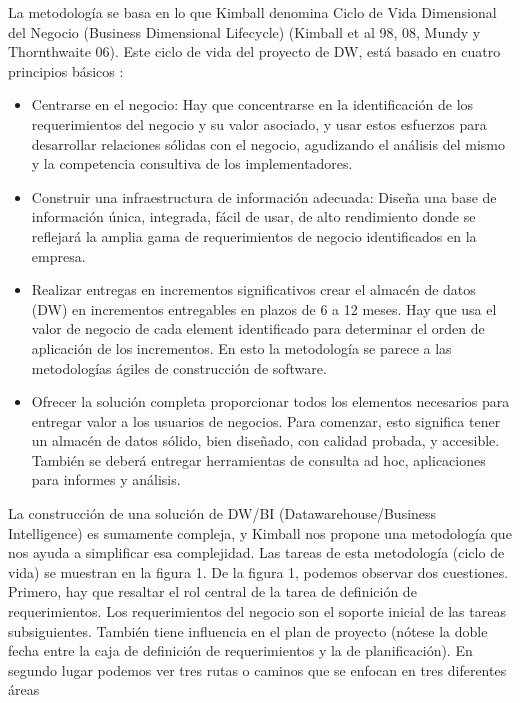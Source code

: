 \documentclass[preprint,12pt]{elsarticle}
\begin{document}
\begin{enumerate}[3.1]
La metodología se basa en lo que Kimball denomina Ciclo de Vida Dimensional del Negocio (Business Dimensional Lifecycle) (Kimball et al 98, 08, Mundy y Thornthwaite 06). Este ciclo de vida del proyecto de DW, está basado en cuatro principios básicos :
\begin{itemize}
  \item Centrarse en el negocio:  Hay que concentrarse en la identificación de los requerimientos del negocio y su valor asociado, y usar estos esfuerzos para desarrollar relaciones sólidas con el negocio, agudizando el análisis del mismo y la competencia consultiva de los implementadores.
\\
  \item Construir una infraestructura de informaci\'on adecuada: Diseña una base de información única, integrada, fácil de usar, de alto rendimiento donde se reflejará la amplia gama de requerimientos de negocio identificados en la empresa.\\
  \item Realizar entregas en incrementos significativos crear el almacén de datos (DW) en incrementos entregables en plazos de 6 a 12 meses. Hay que usa el valor de negocio de cada element identificado para determinar el orden de aplicación de los incrementos. En esto la metodología se parece a las metodologías ágiles de construcción de software.\\
  \item 
Ofrecer la solución completa proporcionar todos los elementos necesarios para entregar valor a los usuarios de negocios. Para comenzar, esto significa tener un almacén de datos sólido, bien diseñado, con calidad probada, y accesible. También se deberá entregar herramientas de consulta ad hoc, aplicaciones para informes y análisis. \\
\end{itemize} 

La construcción de una solución de DW/BI (Datawarehouse/Business Intelligence) es sumamente compleja, y Kimball nos propone una metodología que nos ayuda a simplificar esa complejidad. Las tareas de esta metodología (ciclo de vida) se muestran en la figura 1. 
De la figura 1, podemos observar dos cuestiones. Primero, hay que resaltar el rol central de la tarea de definición de requerimientos. Los requerimientos del negocio son el soporte inicial de las tareas subsiguientes. También tiene influencia en el plan de proyecto (nótese la doble fecha entre la caja de definición de requerimientos y la de planificación). En segundo lugar podemos ver tres rutas o caminos que se enfocan en tres diferentes áreas


\end{enumerate}
\end{document}
